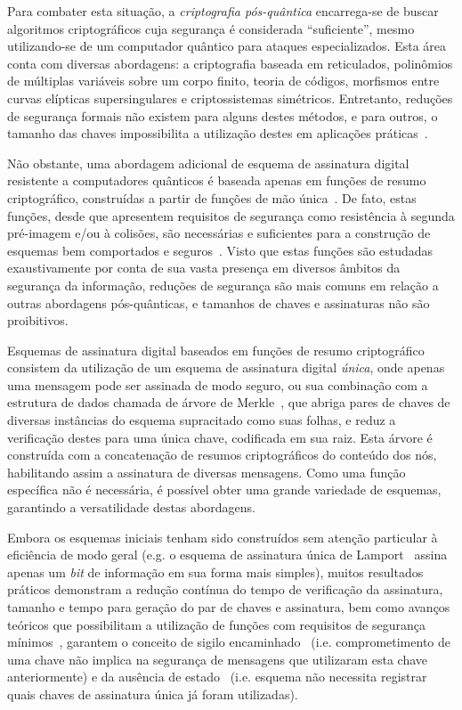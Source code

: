 \documentclass[12pt,notitlepage]{report}
\begin{document}
Para combater esta situação, a \emph{criptografia pós-quântica} encarrega-se de
buscar algoritmos criptográficos cuja segurança é considerada ``suficiente'',
mesmo utilizando-se de um computador quântico para ataques especializados. Esta
área conta com diversas abordagens: a criptografia baseada em reticulados,
polinômios de múltiplas variáveis sobre um corpo finito, teoria de códigos,
morfismos entre curvas elípticas supersingulares e criptossistemas simétricos.
Entretanto, reduções de segurança formais não existem para alguns destes
métodos, e para outros, o tamanho das chaves impossibilita a utilização destes
em aplicações práticas~\cite{Bernstein2017}.

Não obstante, uma abordagem adicional de esquema de assinatura digital
resistente a computadores quânticos é baseada apenas em funções de
resumo criptográfico, construídas a partir de funções de mão
única~\cite{cryptoeprint:2005:328}. De fato, estas funções, desde que
apresentem requisitos de segurança como resistência à segunda pré-imagem e/ou
à colisões, são necessárias e suficientes para a construção de esquemas bem
comportados e seguros~\cite{Rompel:1990:OFN:100216.100269}. Visto que estas
funções são estudadas exaustivamente por conta de sua vasta presença em
diversos âmbitos da segurança da informação, reduções de segurança são mais
comuns em relação a outras abordagens pós-quânticas, e tamanhos de chaves e
assinaturas não são proibitivos.

Esquemas de assinatura digital baseados em funções de resumo criptográfico
consistem da utilização de um esquema de assinatura digital \emph{única}, onde
apenas uma mensagem pode ser assinada de modo seguro, ou sua combinação com a
estrutura de dados chamada de árvore de Merkle~\cite{Merkle:1989:CDS:118209.118230},
que abriga pares de chaves de diversas instâncias
do esquema supracitado como suas folhas, e reduz a verificação destes para uma
única chave, codificada em sua raiz. Esta árvore é construída com a
concatenação de resumos criptográficos do conteúdo dos nós, habilitando assim a
assinatura de diversas mensagens. Como uma função específica não é necessária,
é possível obter uma grande variedade de esquemas, garantindo a versatilidade
destas abordagens.

Embora os esquemas iniciais tenham sido construídos sem atenção particular à
eficiência de modo geral (e.g. o esquema de assinatura única de
Lamport~\cite{lamport1979constructing} assina apenas um \emph{bit}
de informação em sua forma mais simples), muitos resultados práticos demonstram
a redução contínua do tempo de verificação da assinatura, tamanho e tempo para
geração do par de chaves e assinatura, bem como avanços teóricos que
possibilitam a utilização de funções com requisitos de segurança 
mínimos~\cite{Hlsing2013}, garantem o conceito de sigilo
encaminhado~\cite{Buchmann:2011:XPF:2184003.2184011} (i.e. comprometimento de
uma chave não implica na segurança de mensagens que utilizaram esta chave
anteriormente) e da ausência de estado~\cite{Bernstein2015} (i.e. esquema não
necessita registrar quais chaves de assinatura única já foram utilizadas).
\end{document}
